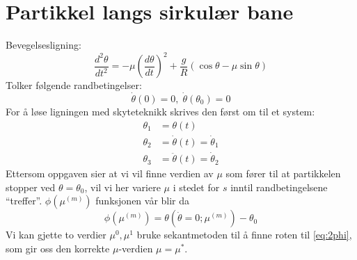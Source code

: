 \clearpage
\section{Partikkel langs sirkulær bane} %
\label{sec:partikkel_langs_sirkul_r_bane}
Bevegelsesligning:
\begin{equation}
  \frac{d^2\theta}{dt^2} = - \mu \left( \frac{d\theta}{dt} \right)^2 + \frac{g}{R} \left( \cos \theta - \mu \sin \theta \right)
\end{equation}
Tolker følgende randbetingelser:
\begin{equation}
  \tag{b}
  \dot\theta(0) = 0, \; \dot\theta(\theta_0) = 0
\end{equation}
For å løse ligningen med skyteteknikk skrives den først om til et system:
\begin{subequations}
\begin{align}
  \theta_1 &= \theta(t) \\
  \theta_2 &= \dot\theta(t) = \dot\theta_1 \\
  \theta_3 &= \ddot\theta(t) = \dot\theta_2
\end{align}
\end{subequations}
Ettersom oppgaven sier at vi vil finne verdien av $\mu$ som fører til at partikkelen stopper ved $\theta=\theta_0$, vil vi her variere $\mu$ i stedet for $s$ inntil randbetingelsene ``treffer''. $\phi(\mu^{(m)})$ funksjonen vår blir da
\begin{equation}
  \phi(\mu^{(m)}) = \theta(\dot\theta=0;\mu^{(m)}) - \theta_0 \label{eq:2phi}
\end{equation}
Vi kan gjette to verdier $\mu^0,\mu^1$ bruke sekantmetoden til å finne roten til \eqref{eq:2phi}, som gir oss den korrekte $\mu$-verdien $\mu = \mu^*$.




